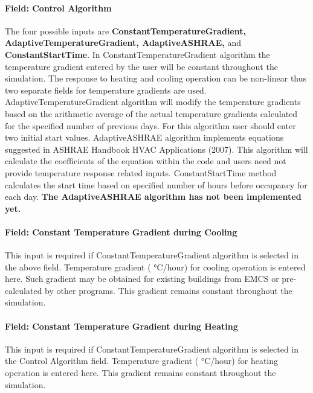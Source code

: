 \paragraph{Field: Control Algorithm}\label{field-control-algorithm}

The four possible inputs are \textbf{ConstantTemperatureGradient, AdaptiveTemperatureGradient, AdaptiveASHRAE,} and \textbf{ConstantStartTime}. In ConstantTemperatureGradient algorithm the temperature gradient entered by the user will be constant throughout the simulation. The response to heating and cooling operation can be non-linear thus two separate fields for temperature gradients are used. AdaptiveTemperatureGradient algorithm will modify the temperature gradients based on the arithmetic average of the actual temperature gradients calculated for the specified number of previous days. For this algorithm user should enter two initial start values. AdaptiveASHRAE algorithm implements equations suggested in ASHRAE Handbook HVAC Applications (2007). This algorithm will calculate the coefficients of the equation within the code and users need not provide temperature response related inputs. ConstantStartTime method calculates the start time based on specified number of hours before occupancy for each day. \textbf{The AdaptiveASHRAE algorithm has not been implemented yet.}

\paragraph{Field: Constant Temperature Gradient during Cooling}\label{field-constant-temperature-gradient-during-cooling}

This input is required if ConstantTemperatureGradient algorithm is selected in the above field. Temperature gradient ( °C/hour) for cooling operation is entered here. Such gradient may be obtained for existing buildings from EMCS or pre-calculated by other programs. This gradient remains constant throughout the simulation.

\paragraph{Field: Constant Temperature Gradient during Heating}\label{field-constant-temperature-gradient-during-heating}

This input is required if ConstantTemperatureGradient algorithm is selected in the Control Algorithm field. Temperature gradient ( °C/hour) for heating operation is entered here. This gradient remains constant throughout the simulation.

